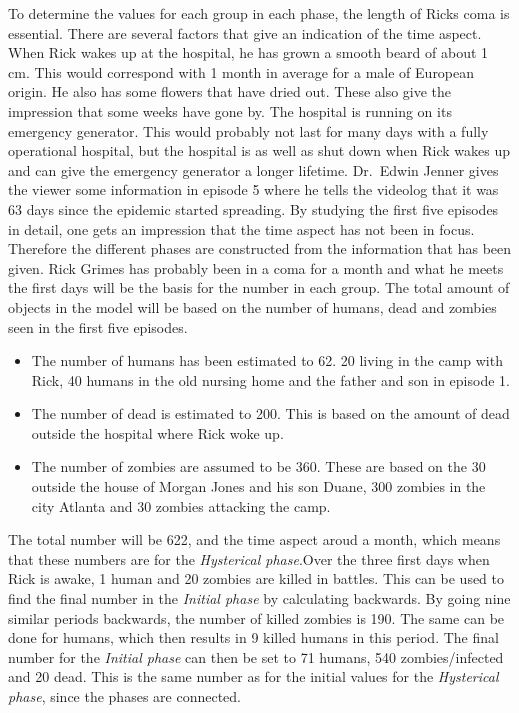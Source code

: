 \documentclass[%
twoside,                 %
final,                   %
chapterprefix=true,      %
open=right               %
10pt]{book}
\begin{document}
To determine the values for each group in each phase, the length of Ricks coma is essential. There are several factors that give an indication of the time aspect. When Rick wakes up at the hospital, he has grown a smooth beard of about 1 cm. This would correspond with 1 month in average for a male of European origin. He also has some flowers that have dried out. These also give the impression that some weeks have gone by. The hospital is running on its emergency generator. This would probably not last for many days with a fully operational hospital, but the hospital is as well as shut down when Rick wakes up and can give the emergency generator a longer lifetime. Dr.~Edwin Jenner gives the viewer some information in episode 5 where he tells the videolog that it was 63 days since the epidemic started spreading. By studying the first five episodes in detail, one gets an impression that the time aspect has not been in focus. Therefore the different phases are constructed from the information that has been given. Rick Grimes has probably been in a coma for a month and what he meets the first days will be the basis for the number in each group. The total amount of objects in the model will be based on the number of humans, dead and zombies seen in the first five episodes. 
\begin{itemize}
 \item The number of humans has been estimated to 62. 20 living in the camp with Rick, 40 humans in the old nursing home and the father and son in episode 1. 

 \item The number of dead is estimated to 200. This is based on the amount of dead outside the hospital where Rick woke up. 

 \item The number of zombies are assumed to be 360. These are based on the 30 outside the house of Morgan Jones and his son Duane, 300 zombies in the city Atlanta and 30 zombies attacking the camp. 
\end{itemize}

\noindent
The total number will be 622, and the time aspect aroud a month, which means that these numbers are for the \emph{Hysterical phase}.Over the three first days when Rick is awake, 1 human and 20 zombies are killed in battles. This can be used to find the final number in the \emph{Initial phase} by calculating backwards. By going nine similar periods backwards, the number of killed zombies is 190. The same can be done for humans, which then results in 9 killed humans in this period. The final number for the \emph{Initial phase} can then be set to 71 humans, 540 zombies/infected and 20 dead. This is the same number as for the initial values for the \emph{Hysterical phase}, since the phases are connected.
\end{document}
